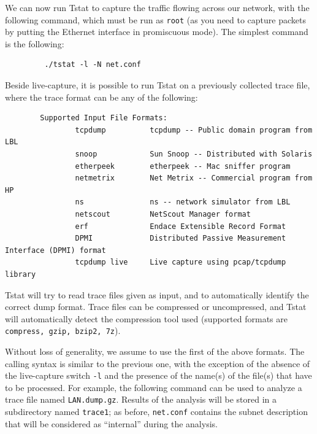 \documentclass[11pt]{article}
\begin{document}
We can now run Tstat to capture the traffic flowing across 
our network, with the following command, which must be run as \texttt{root} (as you
need to capture packets by putting the Ethernet interface in promiscuous mode).
The simplest command is the following:

\begin{small}\begin{verbatim}
         ./tstat -l -N net.conf
\end{verbatim}\end{small} \noindent
Beside live-capture, it is possible to run Tstat on a previously collected 
trace file, where the trace format can be any of the following:

\begin{small}\begin{verbatim}
        Supported Input File Formats:
                tcpdump          tcpdump -- Public domain program from LBL
                snoop            Sun Snoop -- Distributed with Solaris
                etherpeek        etherpeek -- Mac sniffer program
                netmetrix        Net Metrix -- Commercial program from HP
                ns               ns -- network simulator from LBL
                netscout         NetScout Manager format
                erf              Endace Extensible Record Format
                DPMI             Distributed Passive Measurement Interface (DPMI) format
                tcpdump live     Live capture using pcap/tcpdump library
\end{verbatim}\end{small} \noindent
Tstat will try to read trace files given as input, and to automatically identify
the correct dump format. Trace files can be compressed or uncompressed, and
Tstat will automatically detect the compression tool used (supported formats are
\texttt{compress, gzip, bzip2, 7z}).



Without loss of generality, we assume to use the first of the above formats. The
calling syntax is similar to the previous one, with the exception of the absence
of the live-capture switch \texttt{-l} and the presence of the name(s) of the file(s)
that have to be processed. For example, the following command can be used to
analyze a trace file named \texttt{LAN.dump.gz}. Results of the analysis
will be stored in a subdirectory named \texttt{trace1}; as before, \texttt{net.conf} contains  the
subnet description that will be considered as ``internal'' during the
analysis.
\end{document}
